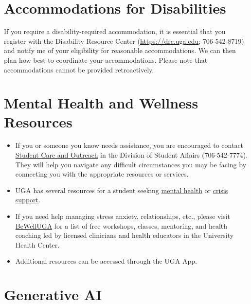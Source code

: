 \documentclass[12pt]{article}
\begin{document}
\vspace{-12pt}
\section*{\normalsize Accommodations for Disabilities}
\vspace{-4mm}

If you require a disability-required accommodation, it is essential
that you register with the Disability Resource Center (\url{https://drc.uga.edu}; 706-542-8719)
and notify me of your eligibility for reasonable accommodations. We
can then plan how best to coordinate your accommodations. Please note
that accommodations cannot be provided retroactively.


\vspace{-12pt}
\section*{\normalsize Mental Health and Wellness Resources}
\vspace{-4mm}

\begin{itemize}
  \setlength\itemsep{-6pt}
  \item If you or someone you know needs assistance, you are
    encouraged to contact \href{https://sco.uga.edu}{Student Care and
      Outreach} in the Division of Student Affairs (706-542-7774). They
    will help you navigate any difficult circumstances you may be facing
    by connecting you with the appropriate resources or services.
  \item UGA has several resources for a student seeking
    \href{https://www.uhs.uga.edu/bewelluga/bewelluga}{mental health}
    or \href{https://www.uhs.uga.edu/info/emergencies}{crisis support}.%
  \item If you need help managing stress anxiety, relationships, etc.,
    please visit \href{https://www.uhs.uga.edu/bewelluga/bewelluga}{BeWellUGA} %
    for a list of free workshops, classes, mentoring, and health
    coaching led by licensed clinicians and health educators in the
    University Health Center.
  \item Additional resources can be accessed through the UGA App.
\end{itemize}



\vspace{-12pt}
\section*{\normalsize Generative AI}
\vspace{-4mm}
\end{document}
